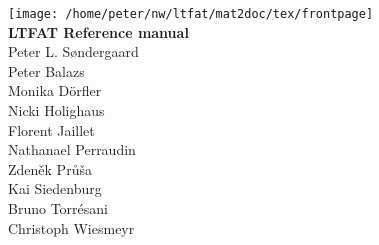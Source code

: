 \documentclass[a4paper]{book}
\begin{document}
\begin{titlepage}
\begin{center}
\texttt{[image: /home/peter/nw/ltfat/mat2doc/tex/frontpage]}
\\[0.4cm]
{ \huge \bfseries LTFAT Reference manual}\\[0.4cm]
\large {Peter L. S{\o}ndergaard } \\
\large {Peter Balazs } \\
\large {Monika D{\"o}rfler } \\
\large {Nicki Holighaus } \\ 
\large {Florent Jaillet } \\ 
\large {Nathanael Perraudin} \\
\large {Zden\v{e}k Pr\r{u}\v{s}a} \\
\large {Kai Siedenburg} \\
\large {Bruno Torr{\'e}sani } \\
\large {Christoph Wiesmeyr } \\


\end{center}

\end{titlepage}

\tableofcontents














\end{document}

